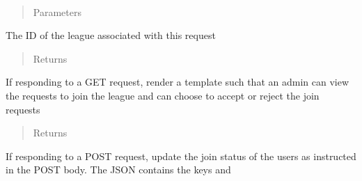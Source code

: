 \documentclass[letterpaper,10pt,english]{sphinxmanual}
\begin{document}
\begin{fulllineitems}
\label{\detokenize{tiger_leagues/readme:tiger_leagues.admin.league_requests}}~\begin{quote}\begin{description}
\item[{Parameters}] \leavevmode
{} \textendash{} 

\end{description}\end{quote}

The ID of the league associated with this request
\begin{quote}\begin{description}
\item[{Returns}] \leavevmode
{}

\end{description}\end{quote}

If responding to a GET request, render a template such that an admin can 
view the requests to join the league and can choose to accept or reject the 
join requests
\begin{quote}\begin{description}
\item[{Returns}] \leavevmode
{}

\end{description}\end{quote}

If responding to a POST request, update the join status of the users as 
instructed in the POST body. The JSON contains the keys  and 

\end{fulllineitems}

\end{document}
